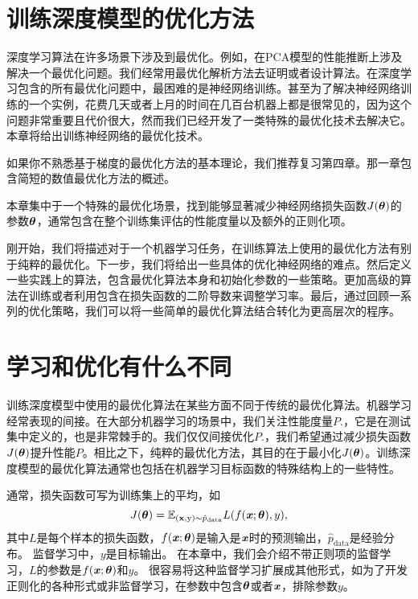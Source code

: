 \section{训练深度模型的优化方法}

深度学习算法在许多场景下涉及到最优化。例如，在PCA模型的性能推断上涉及解决一个最优化问题。我们经常用最优化解析方法去证明或者设计算法。在深度学习包含的所有最优化问题中，最困难的是神经网络训练。甚至为了解决神经网络训练的一个实例，花费几天或者上月的时间在几百台机器上都是很常见的，因为这个问题非常重要且代价很大，然而我们已经开发了一类特殊的最优化技术去解决它。本章将给出训练神经网络的最优化技术。

如果你不熟悉基于梯度的最优化方法的基本理论，我们推荐复习第四章。那一章包含简短的数值最优化方法的概述。

本章集中于一个特殊的最优化场景，找到能够显著减少神经网络损失函数$J(\boldsymbol{\theta})$的参数$\boldsymbol{\theta}$，通常包含在整个训练集评估的性能度量以及额外的正则化项。
	
刚开始，我们将描述对于一个机器学习任务，在训练算法上使用的最优化方法有别于纯粹的最优化。下一步，我们将给出一些具体的优化神经网络的难点。然后定义一些实践上的算法，包含最优化算法本身和初始化参数的一些策略。更加高级的算法在训练或者利用包含在损失函数的二阶导数来调整学习率。最后，通过回顾一系列的优化策略，我们可以将一些简单的最优化算法结合转化为更高层次的程序。

\section{学习和优化有什么不同}

训练深度模型中使用的最优化算法在某些方面不同于传统的最优化算法。机器学习经常表现的间接。在大部分机器学习的场景中，我们关注性能度量$P$.，它是在测试集中定义的，也是非常棘手的。我们仅仅间接优化$P$.，我们希望通过减少损失函数$J(\boldsymbol{\theta})$提升性能$P$。相比之下，纯粹的最优化方法，其目的在于最小化$J(\boldsymbol{\theta})$。训练深度模型的最优化算法通常也包括在机器学习目标函数的特殊结构上的一些特性。

通常，损失函数可写为训练集上的平均，如
\begin{equation}
\label{eq:8.1}
    J(\boldsymbol{\theta}) = \mathbb{E}_{(\mathbf{x}, \mathrm{y}) \sim\hat{p}_\text{data}} L(f(\boldsymbol{\mathit{x}} ; \boldsymbol{\theta}), y),
\end{equation}
其中$L$是每个样本的损失函数，$f(\boldsymbol{\mathit{x}};\boldsymbol{\theta})$是输入是$\boldsymbol{\mathit{x}}$时的预测输出，$\hat{p}_{\text{data}}$是经验分布。
监督学习中，$y$是目标输出。
在本章中，我们会介绍不带正则项的监督学习，$L$的参数是$f(\boldsymbol{\mathit{x}};\boldsymbol{\theta})$和$y$。
很容易将这种监督学习扩展成其他形式，如为了开发正则化的各种形式或非监督学习，在参数中包含$\boldsymbol{\theta}$或者$\boldsymbol{\mathit{x}}$，排除参数$y$。


